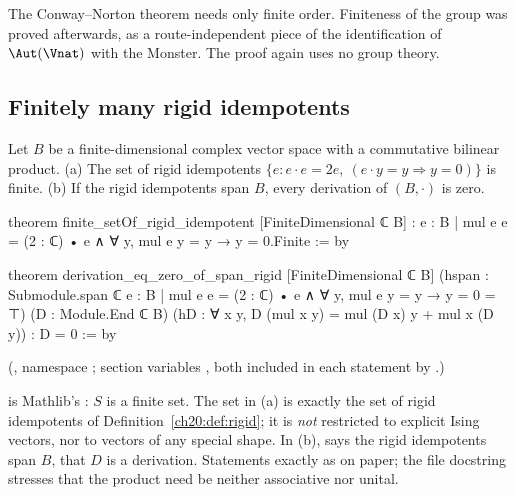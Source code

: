 The Conway--Norton theorem needs only finite order.  Finiteness of the group was proved afterwards, as a
route-independent piece of the identification of $\Aut(\Vnat)$ with the Monster.  The proof again uses no group theory.

\subsection{Finitely many rigid idempotents}

\begin{theorem}\label{ch20:thm:finrigid}
Let $B$ be a finite-dimensional complex vector space with a commutative bilinear product.  (a) The set of rigid
idempotents $\{e: e\cdot e=2e,\ (e\cdot y=y\Rightarrow y=0)\}$ is finite.  (b) If the rigid idempotents span $B$, every
derivation of $(B,\cdot)$ is zero.
\end{theorem}
\begin{leancode}
theorem finite_setOf_rigid_idempotent [FiniteDimensional ℂ B] :
    {e : B | mul e e = (2 : ℂ) • e ∧ ∀ y, mul e y = y → y = 0}.Finite := by

theorem derivation_eq_zero_of_span_rigid [FiniteDimensional ℂ B]
    (hspan : Submodule.span ℂ
      {e : B | mul e e = (2 : ℂ) • e ∧ ∀ y, mul e y = y → y = 0} = ⊤)
    (D : Module.End ℂ B)
    (hD : ∀ x y, D (mul x y) = mul (D x) y + mul x (D y)) : D = 0 := by
\end{leancode}
(, namespace ; section variables
, both included in each statement by
.)
\begin{dictionary}
 is Mathlib's : $S$ is a finite set.  The set in (a) is exactly the set of rigid
idempotents of Definition~\ref{ch20:def:rigid}; it is \emph{not} restricted to explicit Ising vectors, nor to vectors of any
special shape.  In (b),  says the rigid idempotents span $B$,  that $D$ is a derivation.  Statements
exactly as on paper; the file docstring stresses that the product need be neither associative nor unital.
\end{dictionary}
